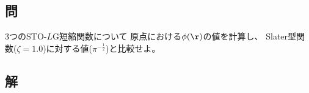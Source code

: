 \subsection{問}
3つのSTO-$L$G短縮関数について
原点における$\phi(\r)$の値を計算し、
Slater型関数($\zeta=1.0$)に対する値($\pi^{-\frac{1}{2}}$)と比較せよ。


\subsection{解}



